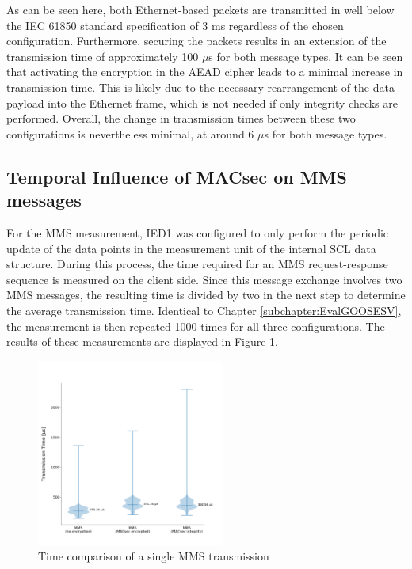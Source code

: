 \documentclass[conference, onecolumn, a4paper]{IEEEtran}
\begin{document}
\noindent As can be seen here, both Ethernet-based packets are transmitted in well below the IEC 61850 standard specification of 3 ms 
\cite{fixedLatencyGOOSESV:2021} regardless of the chosen configuration. Furthermore, securing the packets results in an extension of the transmission 
time of approximately 100 $\mu$s for both message types. It can be seen that activating the encryption in the AEAD cipher leads to a minimal 
increase in transmission time. This is likely due to the necessary rearrangement of the data payload into the Ethernet frame, which is not needed 
if only integrity checks are performed. Overall, the change in transmission times between these two configurations is nevertheless minimal, at around 
6 $\mu$s for both message types. 

\subsection{Temporal Influence of MACsec on MMS messages}
\label{subchapter:EvalMMS}
\noindent For the MMS measurement, IED1 was configured to only perform the periodic update of the data points in the measurement unit of the internal 
SCL data structure. During this process, the time required for an MMS request-response sequence is measured on the client side. Since this message 
exchange involves two MMS messages, the resulting time is divided by two in the next step to determine the average transmission time. Identical to 
Chapter \ref{subchapter:EvalGOOSESV}, the measurement is then repeated 1000 times for all three configurations. The results of these measurements are 
displayed in Figure \ref{image:MMSTimings}. 

\begin{figure}[h]
    \centering
    \includegraphics[width=0.55\textwidth]{images/MMS_group_all_configs.png}
    \caption{Time comparison of a single MMS transmission}
    \label{image:MMSTimings}
\end{figure}
\end{document}
